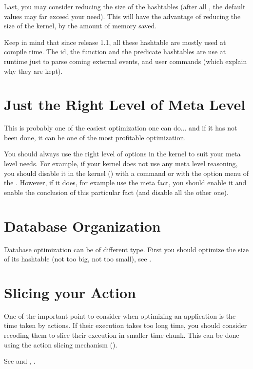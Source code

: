 Last, you may consider reducing the size of the hashtables (after all ,
the default values may far exceed your need). This will have the
advantage of reducing the size of the kernel, by the amount of memory
saved.

Keep in mind that since release 1.1, all these hashtable are mostly used at
compile time. The id, the function and the predicate hashtables are use at
runtime just to parse coming external events, and user commands (which explain
why they are kept).

\section{Just the Right Level of Meta Level}

This is probably one of the easiest optimization one can do... and if it
has not been done, it can be one of the most profitable optimization.

You should always use the right level of options in the kernel to suit
your meta level needs. For example, if your kernel does not use any meta
level reasoning, you should disable it in the kernel () with a  command or with the option menu of
the \XPK{}. However, if it does, for example use the  meta
fact, you should enable it and enable the conclusion of this particular
fact (and disable all the other one).

\section{Database Organization}

Database optimization can be of different type. First you should optimize
the size of its hashtable (not too big, not too small), see
.

\section{Slicing your Action}

One of the important point to consider when optimizing an application is
the time taken by actions. If their execution takes too long time, you should
consider recoding them to slice their execution in smaller time chunk. This can
be done using the action slicing mechanism ().

See  and ,
. 


